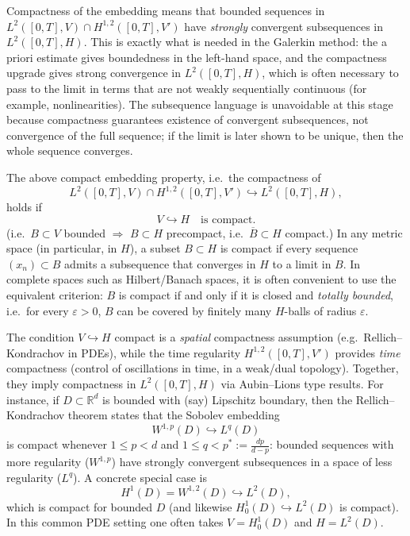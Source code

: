 \documentclass[11pt]{article}
\theoremstyle{definition}
\theoremstyle{remark}
\begin{document}
Compactness of the embedding means that bounded sequences in
\(
L^{2}([0,T],V)\cap H^{1,2}([0,T],V')
\)
have \emph{strongly} convergent subsequences in \(L^{2}([0,T],H)\).
This is exactly what is needed in the Galerkin method: the a priori estimate gives boundedness in the left-hand space, and the compactness upgrade gives strong convergence in \(L^{2}([0,T],H)\), which is often necessary to pass to the limit in terms that are not weakly sequentially continuous (for example, nonlinearities).
The subsequence language is unavoidable at this stage because compactness guarantees existence of convergent subsequences, not convergence of the full sequence; if the limit is later shown to be unique, then the whole sequence converges.

The above compact embedding property, i.e.\ the compactness of
\[
L^{2}([0,T],V)\cap H^{1,2}([0,T],V')\hookrightarrow L^{2}([0,T],H),
\]
holds if
\[
V\hookrightarrow H \quad \text{is compact}.
\]
(i.e.\ \(B\subset V\) bounded \(\Rightarrow\) \(B\subset H\) precompact, i.e.\ \(\overline{B}\subset H\) compact.)
In any metric space (in particular, in \(H\)), a subset \(B\subset H\) is compact if every sequence \((x_n)\subset B\) admits a subsequence that converges in \(H\) to a limit in \(B\).
In complete spaces such as Hilbert/Banach spaces, it is often convenient to use the equivalent criterion: \(B\) is compact if and only if it is closed and \emph{totally bounded}, i.e.\ for every \(\varepsilon>0\), \(B\) can be covered by finitely many \(H\)-balls of radius \(\varepsilon\).

The condition \(V\hookrightarrow H\) compact is a \emph{spatial} compactness assumption (e.g.\ Rellich--Kondrachov in PDEs), while the time regularity \(H^{1,2}([0,T],V')\) provides \emph{time} compactness (control of oscillations in time, in a weak/dual topology).
Together, they imply compactness in \(L^{2}([0,T],H)\) via Aubin--Lions type results.
For instance, if \(D\subset\mathbb{R}^{d}\) is bounded with (say) Lipschitz boundary, then the Rellich--Kondrachov theorem states that the Sobolev embedding
\[
W^{1,p}(D)\hookrightarrow L^{q}(D)
\]
is compact whenever \(1\le p<d\) and \(1\le q< p^\ast:=\frac{dp}{d-p}\): bounded sequences with more regularity (\(W^{1,p}\)) have strongly convergent subsequences in a space of less regularity (\(L^{q}\)). A concrete special case is
\[
H^{1}(D)=W^{1,2}(D)\hookrightarrow L^{2}(D),
\]
which is compact for bounded \(D\) (and likewise \(H_{0}^{1}(D)\hookrightarrow L^{2}(D)\) is compact). In this common PDE setting one often takes \(V=H_{0}^{1}(D)\) and \(H=L^{2}(D)\).
\end{document}
